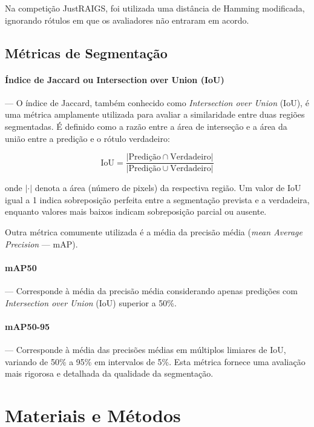 \documentclass[12pt]{article}
\begin{document}
Na competição JustRAIGS, foi utilizada uma distância de Hamming modificada, ignorando rótulos em que os avaliadores não entraram em acordo.


\subsection{Métricas de Segmentação}
\label{sec:metrics_segmentation}

\paragraph{Índice de Jaccard ou Intersection over Union (IoU)} ---
O índice de Jaccard, também conhecido como \emph{Intersection over Union} (IoU), é uma métrica amplamente utilizada para avaliar a similaridade entre duas regiões segmentadas. É definido como a razão entre a área de interseção e a área da união entre a predição e o rótulo verdadeiro:

\begin{equation}
\text{IoU} = \frac{|\text{Predição} \cap \text{Verdadeiro}|}{|\text{Predição} \cup \text{Verdadeiro}|}
\end{equation}

\noindent onde \( |\cdot| \) denota a área (número de pixels) da respectiva região. Um valor de IoU igual a 1 indica sobreposição perfeita entre a segmentação prevista e a verdadeira, enquanto valores mais baixos indicam sobreposição parcial ou ausente.

Outra métrica comumente utilizada é a média da precisão média (\emph{mean Average Precision} --- mAP).

\paragraph{mAP50} --- Corresponde à média da precisão média considerando apenas predições com \emph{Intersection over Union} (IoU) superior a 50\%.

\paragraph{mAP50-95} --- Corresponde à média das precisões médias em múltiplos limiares de IoU, variando de 50\% a 95\% em intervalos de 5\%. Esta métrica fornece uma avaliação mais rigorosa e detalhada da qualidade da segmentação.


\section{Materiais e Métodos}
\label{sec:methodology}
\end{document}
